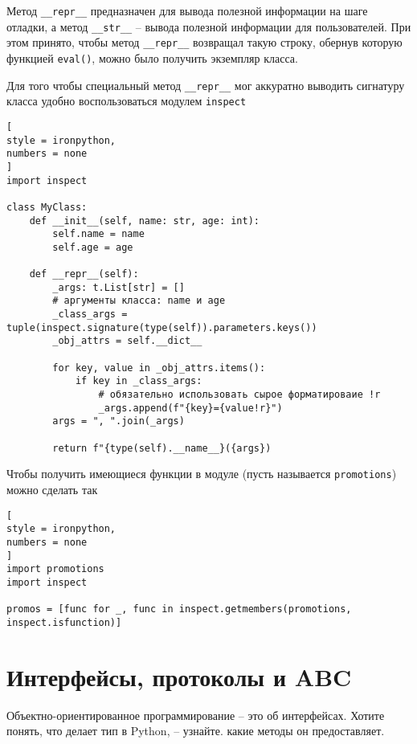 \documentclass[%
	11pt,
	a4paper,
	utf8,
		]{article}
\begin{document}
Метод \verb|__repr__| предназначен для вывода полезной информации на шаге отладки, а метод \verb|__str__| -- вывода полезной информации для пользователей. При этом принято, чтобы метод \verb|__repr__| возвращал такую строку, обернув которую функцией \verb|eval()|, можно было получить экземпляр класса.
	
Для того чтобы специальный метод \verb|__repr__| мог аккуратно выводить сигнатуру класса удобно воспользоваться модулем \verb|inspect|
\begin{lstlisting}[
style = ironpython,
numbers = none
]
import inspect

class MyClass:
    def __init__(self, name: str, age: int):
        self.name = name
        self.age = age
        
    def __repr__(self):
        _args: t.List[str] = []
        # аргументы класса: name и age
        _class_args = tuple(inspect.signature(type(self)).parameters.keys())
        _obj_attrs = self.__dict__
        
        for key, value in _obj_attrs.items():
            if key in _class_args:
                # обязательно использовать сырое форматироваие !r
                _args.append(f"{key}={value!r}")  
        args = ", ".join(_args)
        
        return f"{type(self).__name__}({args})
\end{lstlisting}

Чтобы получить имеющиеся функции в модуле (пусть называется \verb*|promotions|) можно сделать так \cite[]{ramalho:python-2022}
\begin{lstlisting}[
style = ironpython,
numbers = none
]
import promotions
import inspect

promos = [func for _, func in inspect.getmembers(promotions, inspect.isfunction)]
\end{lstlisting}

\section{ Интерфейсы, протоколы и ABC}

Объектно-ориентированное программирование -- это об интерфейсах. Хотите понять, что делает тип в Python, -- узнайте. какие методы он предоставляет.
\end{document}
